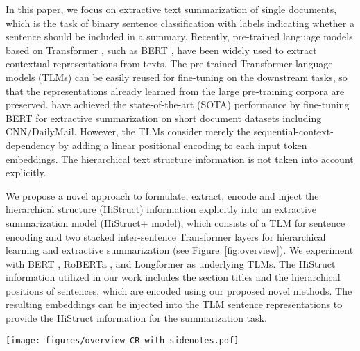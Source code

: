 \documentclass[11pt]{article}
\begin{document}
In this paper, we focus on extractive text summarization of single documents, which is the task of binary sentence classification with labels indicating whether a sentence should be included in a summary. Recently, pre-trained language models based on Transformer \cite{transformer}, such as BERT \cite{bert}, have been widely used to extract contextual representations from texts. The pre-trained Transformer language models (TLMs) can be easily reused for fine-tuning on the downstream tasks, so that the representations already learned from the large pre-training corpora are preserved. \citet{presumm} have achieved the state-of-the-art (SOTA) performance by fine-tuning BERT for extractive summarization on short document datasets including CNN/DailyMail. However, the TLMs consider merely the sequential-context-dependency by adding a linear positional encoding to each input token embeddings. The hierarchical text structure information is not taken into account explicitly.

We propose a novel approach to formulate, extract, encode and inject the hierarchical structure (HiStruct) information explicitly into an extractive summarization model (HiStruct+ model), which consists of a TLM for sentence encoding and two stacked inter-sentence Transformer layers for hierarchical learning and extractive summarization (see Figure~\ref{fig:overview}). 
We experiment with BERT \cite{bert}, RoBERTa \cite{roberta}, and Longformer \cite{longformer} as underlying TLMs.
The HiStruct information utilized in our work includes the section titles and the hierarchical positions of sentences, which are encoded using our proposed novel methods. 
The resulting embeddings can be injected into the TLM sentence representations to provide the HiStruct information for the summarization task. 


\begin{figure*}[ht]
  \centering
  \texttt{[image: figures/overview\_CR\_with\_sidenotes.pdf]}
  \caption[Architecture of the HiStruct+ model]{Architecture of the HiStruct+ model. The  model consists of a base
TLM for sentence encoding and two stacked inter-sentence Transformer layers for hierarchical contextual learning with a sigmoid classifier for extractive summarization. The two blocks shaded in light-green are the HiStruct injection components.}
  \label{fig:overview}
\end{figure*}
\end{document}
